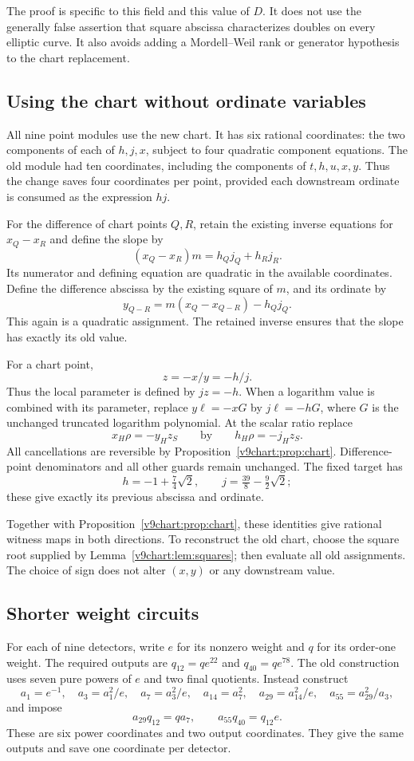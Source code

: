 The proof is specific to this field and this value of $D$. It does not use the generally false assertion that square abscissa characterizes doubles on every elliptic curve. It also avoids adding a Mordell--Weil rank or generator hypothesis to the chart replacement.

\subsection{Using the chart without ordinate variables}
All nine point modules use the new chart. It has six rational coordinates: the two components of each of $h,j,x$, subject to four quadratic component equations. The old module had ten coordinates, including the components of $t,h,u,x,y$. Thus the change saves four coordinates per point, provided each downstream ordinate is consumed as the expression $hj$.

For the difference of chart points $Q,R$, retain the existing inverse equations for $x_Q-x_R$ and define the slope by
\[
 (x_Q-x_R)m=h_Qj_Q+h_Rj_R.
\]
Its numerator and defining equation are quadratic in the available coordinates. Define the difference abscissa by the existing square of $m$, and its ordinate by
\[
 y_{Q-R}=m(x_Q-x_{Q-R})-h_Qj_Q.
\]
This again is a quadratic assignment. The retained inverse ensures that the slope has exactly its old value.

For a chart point,
\[
 z=-x/y=-h/j.
\]
Thus the local parameter is defined by $jz=-h$. When a logarithm value is combined with its parameter, replace $y\ell=-xG$ by $j\ell=-hG$, where $G$ is the unchanged truncated logarithm polynomial. At the scalar ratio replace
\[
 x_H\rho=-y_Hz_S\qquad\text{by}\qquad h_H\rho=-j_Hz_S.
\]
All cancellations are reversible by Proposition~\ref{v9chart:prop:chart}. Difference-point denominators and all other guards remain unchanged. The fixed target has
\[
 h=-1+\tfrac74\sqrt2,\qquad j=\tfrac{39}{8}-\tfrac92\sqrt2;
\]
these give exactly its previous abscissa and ordinate.

Together with Proposition~\ref{v9chart:prop:chart}, these identities give rational witness maps in both directions. To reconstruct the old chart, choose the square root supplied by Lemma~\ref{v9chart:lem:squares}; then evaluate all old assignments. The choice of sign does not alter $(x,y)$ or any downstream value.

\subsection{Shorter weight circuits}\label{subsec:v9-laurent}
For each of nine detectors, write $e$ for its nonzero weight and $q$ for its order-one weight. The required outputs are $q_{12}=qe^{22}$ and $q_{40}=qe^{78}$. The old construction uses seven pure powers of $e$ and two final quotients. Instead construct
\[
 a_1=e^{-1},\quad a_3=a_1^2/e,\quad a_7=a_3^2/e,\quad
 a_{14}=a_7^2,\quad a_{29}=a_{14}^2/e,\quad a_{55}=a_{29}^2/a_3,
\]
and impose
\[
 a_{29}q_{12}=qa_7,\qquad a_{55}q_{40}=q_{12}e.
\]
These are six power coordinates and two output coordinates. They give the same outputs and save one coordinate per detector.

